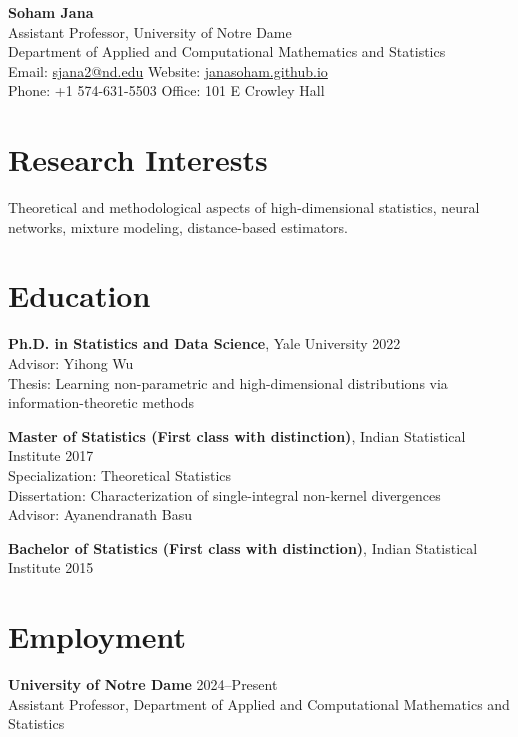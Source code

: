 \documentclass[11pt]{article}
\begin{document}
	
	{\Huge \textbf{Soham Jana}} \\[4pt]
	Assistant Professor, University of Notre Dame \\
	Department of Applied and Computational Mathematics and Statistics \\
	Email: \href{mailto:sjana2@nd.edu}{sjana2@nd.edu} \quad
	Website: \href{https://janasoham.github.io}{janasoham.github.io}\\
	Phone: +1 574-631-5503 \quad Office: 101 E Crowley Hall
	
	\vspace{6pt}
	
	\section*{Research Interests}
	Theoretical and methodological aspects of high-dimensional statistics, neural networks, mixture modeling, distance-based estimators.
	
	\section*{Education}
	\textbf{Ph.D. in Statistics and Data Science}, Yale University \hfill 2022 \\
	Advisor: Yihong Wu \\
	Thesis: Learning non-parametric and high-dimensional distributions via information-theoretic methods
	
	\textbf{Master of Statistics (First class with distinction)}, Indian Statistical Institute \hfill 2017 \\
	Specialization: Theoretical Statistics \\
	Dissertation: Characterization of single-integral non-kernel divergences \\
	Advisor: Ayanendranath Basu
	
	\textbf{Bachelor of Statistics (First class with distinction)}, Indian Statistical Institute \hfill 2015
	
	\section*{Employment}
	\textbf{University of Notre Dame} \hfill 2024--Present \\
	Assistant Professor, Department of Applied and Computational Mathematics and Statistics
	
\end{document}
